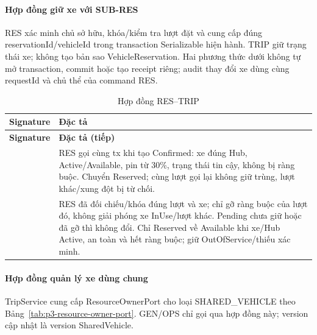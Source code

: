 \paragraph{Hợp đồng giữ xe với SUB-RES}
RES xác minh chủ sở hữu, khóa/kiểm tra lượt đặt và cung cấp đúng reservationId/vehicleId trong transaction Serializable hiện hành. TRIP giữ trạng thái xe; không tạo bản sao VehicleReservation. Hai phương thức dưới không tự mở transaction, commit hoặc tạo receipt riêng; audit thay đổi xe dùng cùng requestId và chủ thể của command RES.

\begin{longtable}{|L{58mm}|L{81mm}|}
\caption{Hợp đồng RES--TRIP}\label{tab:p3-trip-res-contract}\\\hline
\textbf{Signature} & \textbf{Đặc tả}\\\hline
\endfirsthead
\hline\textbf{Signature} & \textbf{Đặc tả (tiếp)}\\\hline\endhead
{} &
RES gọi cùng tx khi tạo Confirmed: xe đúng Hub, Active/Available, pin từ 30\%, trạng thái tin cậy, không bị ràng buộc. Chuyển Reserved; cùng lượt gọi lại không giữ trùng, lượt khác/xung đột bị từ chối.\\\hline
{} &
RES đã đối chiếu/khóa đúng lượt và xe; chỉ gỡ ràng buộc của lượt đó, không giải phóng xe InUse/lượt khác. Pending chưa giữ hoặc đã gỡ thì không đổi. Chỉ Reserved về Available khi xe/Hub Active, an toàn và hết ràng buộc; giữ OutOfService/thiếu xác minh.\\\hline
\end{longtable}

\paragraph{Hợp đồng quản lý xe dùng chung}
TripService cung cấp ResourceOwnerPort cho loại SHARED\_VEHICLE theo Bảng~\ref{tab:p3-resource-owner-port}. GEN/OPS chỉ gọi qua hợp đồng này; version cập nhật là version SharedVehicle.

